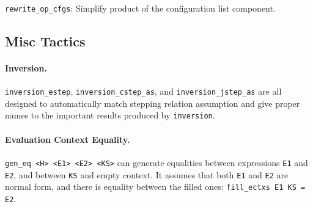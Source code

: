 \texttt{rewrite\_op\_cfgs}: Simplify product of the configuration list component.

\subsection{Misc Tactics}

\paragraph{Inversion. } \texttt{inversion\_estep}, \texttt{inversion\_cstep\_as}, and \texttt{inversion\_jstep\_as}
are all designed to automatically match stepping relation assumption and give proper names to the important results
produced by \texttt{inversion}.

\paragraph{Evaluation Context Equality. } \texttt{gen\_eq <H> <E1> <E2> <KS>} can generate equalities
between expressions \texttt{E1} and \texttt{E2}, and between \texttt{KS} and empty context.
It assumes that both \texttt{E1} and \texttt{E2} are normal form, and there is equality between
the filled ones: \texttt{fill\_ectxs E1 KS = E2}.
